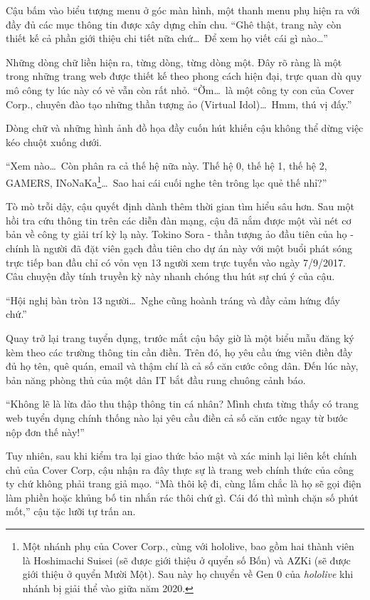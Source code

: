 \documentclass[../main.tex]{subfiles}
\begin{document}
Cậu bấm vào biểu tượng menu ở góc màn hình, một thanh menu phụ hiện ra với đầy đủ các mục thông tin được xây dựng chỉn chu. ``Ghê thật, trang này còn thiết kế cả phần giới thiệu chi tiết nữa chứ\dots\ Để xem họ viết cái gì nào\dots''

Những dòng chữ liền hiện ra, từng dòng, từng dòng một. Đây rõ ràng là một trong những trang web được thiết kế theo phong cách hiện đại, trực quan dù quy mô công ty lúc này có vẻ vẫn còn rất nhỏ. ``Ờm\dots\ là một công ty con của Cover Corp., chuyên đào tạo những thần tượng ảo (Virtual Idol)\dots\ Hmm, thú vị đấy.''

Dòng chữ và những hình ảnh đồ họa đầy cuốn hút khiến cậu không thể dừng việc kéo chuột xuống dưới.

``Xem nào\dots\ Còn phân ra cả thế hệ nữa này. Thế hệ 0, thế hệ 1, thế hệ 2, GAMERS, INoNaKa\footnote{Một nhánh phụ của Cover Corp., cùng với hololive, bao gồm hai thành viên là Hoshimachi Suisei (sẽ được giới thiệu ở quyển số Bốn) và AZKi (sẽ được giới thiệu ở quyển Mười Một). Sau này họ chuyển về Gen 0 của \textit{hololive} khi nhánh bị giải thể vào giữa năm 2020.}\dots\ Sao hai cái cuối nghe tên trông lạc quẻ thế nhỉ?''

Tò mò trỗi dậy, cậu quyết định dành thêm thời gian tìm hiểu sâu hơn. Sau một hồi tra cứu thông tin trên các diễn đàn mạng, cậu đã nắm được một vài nét cơ bản về công ty giải trí kỳ lạ này. Tokino Sora - thần tượng ảo đầu tiên của họ - chính là người đã đặt viên gạch đầu tiên cho dự án này với một buổi phát sóng trực tiếp ban đầu chỉ có vỏn vẹn 13 người xem trực tuyến vào ngày 7/9/2017. Câu chuyện đầy tính truyền kỳ này nhanh chóng thu hút sự chú ý của cậu.

``Hội nghị bàn tròn 13 người\dots\ Nghe cũng hoành tráng và đầy cảm hứng đấy chứ.''

Quay trở lại trang tuyển dụng, trước mắt cậu bây giờ là một biểu mẫu đăng ký kèm theo các trường thông tin cần điền. Trên đó, họ yêu cầu ứng viên điền đầy đủ họ tên, quê quán, email và thậm chí là cả số căn cước công dân. Đến lúc này, bản năng phòng thủ của một dân IT bắt đầu rung chuông cảnh báo.

``Không lẽ là lừa đảo thu thập thông tin cá nhân? Mình chưa từng thấy có trang web tuyển dụng chính thống nào lại yêu cầu điền cả số căn cước ngay từ bước nộp đơn thế này!''

Tuy nhiên, sau khi kiểm tra lại giao thức bảo mật và xác minh lại liên kết chính chủ của Cover Corp, cậu nhận ra đây thực sự là trang web chính thức của công ty chứ không phải trang giả mạo. ``Mà thôi kệ đi, cùng lắm chắc là họ sẽ gọi điện làm phiền hoặc khủng bố tin nhắn rác thôi chứ gì. Cái đó thì mình chặn số phút mốt,'' cậu tặc lưỡi tự trấn an.
\end{document}
